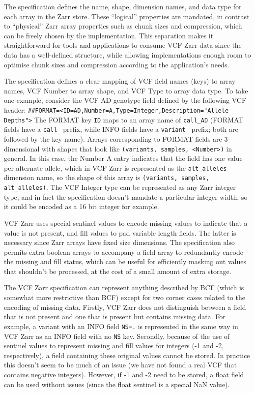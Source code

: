 \documentclass[a4paper,num-refs]{oup-contemporary}
\begin{document}

The specification defines the name, shape, dimension names, and data type
for each array in the Zarr store. These ``logical'' properties are mandated,
in contrast to ``physical'' Zarr array properties such as chunk sizes and
compression, which can be freely chosen by the implementation. This
separation makes it straightforward for tools and applications to consume
VCF Zarr data since the data has a well-defined structure, while allowing
implementations enough room to optimise chunk sizes and compression
according to the application's needs.

The specification defines a clear mapping of VCF field names (keys) to
array names, VCF Number to array shape, and VCF Type to array data type.
To take one example, consider the VCF AD genotype field defined by the
following VCF header: \texttt{\#\#FORMAT=<ID=AD,Number=A,Type=Integer,Description="Allele Depths">}
The FORMAT key \texttt{ID} maps to an array name of \texttt{call\_AD}
(FORMAT fields have a \texttt{call\_} prefix, while INFO fields have a
\texttt{variant\_} prefix; both are followed by the key name). Arrays
corresponding to FORMAT fields are 3-dimensional with shapes that look
like \texttt{(variants, samples, <Number>)} in general. In this case, the
Number A entry indicates that the field has one value per alternate allele,
which in VCF Zarr is represented as the \texttt{alt\_alleles} dimension name,
so the shape of this array is \texttt{(variants, samples, alt\_alleles)}.
The VCF Integer type can be represented as any Zarr integer type, and in
fact the specification doesn't mandate a particular integer width, so it
could be encoded as a 16 bit integer for example.

VCF Zarr uses special sentinel values to encode missing values to indicate
that a value is not present, and fill values to pad variable length fields.
The latter is necessary since Zarr arrays have fixed size dimensions. The
specification also permits extra boolean arrays to accompany a field array
to redundantly encode the missing and fill status, which can be useful for
efficiently masking out values that shouldn't be processed, at the cost of
a small amount of extra storage.

The VCF Zarr specification can represent anything described by BCF
(which is somewhat more restrictive than BCF) except for two corner
cases related to the encoding of missing data. Firstly, VCF Zarr does
not distinguish between a field that is not present and one that 
is present but contains missing data. For example, a variant with an
INFO field \texttt{NS=.} is represented in the same way in VCF Zarr
as an INFO field with no \texttt{NS} key. Secondly, because of the use
of sentinel values to represent missing and fill values for integers
(-1 and -2, respectively), a field containing these original values
cannot be stored. In practice this doesn't seem to be much of 
an issue (we have not found a real VCF that contains negative 
integers). However, if -1 and -2 need to be stored, a float field
can be used without issues (since the float sentinel is a special NaN
value).
\end{document}
